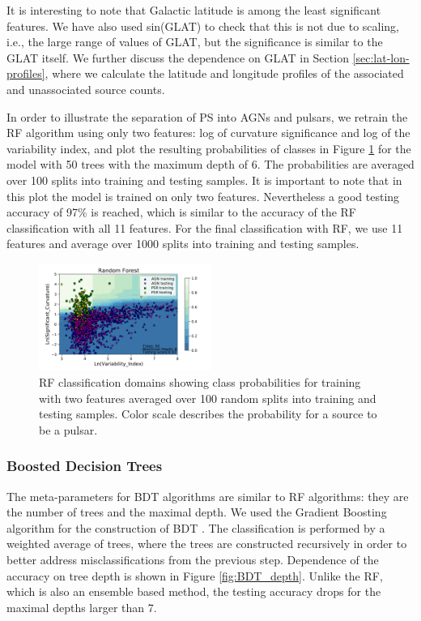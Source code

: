 It is interesting to note that Galactic latitude is among the least significant features.
We have also used sin(GLAT) to check that this is not due to scaling, i.e., the large range of values of GLAT,
but the significance is similar to the GLAT itself.
We further discuss the dependence on GLAT in Section \ref{sec:lat-lon-profiles}, 
where we calculate the latitude and longitude profiles of the associated and unassociated source counts.

In order to illustrate the separation of PS into AGNs and pulsars, we retrain the RF algorithm using only two features: log of curvature significance and log of the variability index, and plot the resulting probabilities of classes in Figure \ref{fig:RF_domains}
for the model with 50 trees with the maximum depth of 6.
The probabilities are averaged over 100 splits into training and testing samples.
It is important to note that in this plot the model is trained on only two features. Nevertheless a good testing accuracy of 97\% is reached, 
which is similar to the accuracy of the RF classification with all 11 features.
For the final classification with RF, we use 11 features and average over 1000 splits into training and testing samples.

\begin{figure}[h]

\includegraphics[width=0.5\textwidth]{plots/classification_domains/rf_50_6_final.pdf}
\caption{RF classification domains showing class probabilities for training with two features
averaged over 100 random splits into training and testing samples.
Color scale describes the probability for a source to be a pulsar.
}
\label{fig:RF_domains}
\end{figure}



\subsubsection{Boosted Decision Trees}

The meta-parameters for BDT algorithms are similar to RF algorithms: they are the number of trees and the maximal depth.
We used the Gradient Boosting algorithm for the construction of BDT \citep{gb}.
The classification is performed by a weighted average of trees, where the trees are constructed recursively in order to better address 
misclassifications from the previous step. 
Dependence of the accuracy on tree depth is shown in Figure \ref{fig:BDT_depth}. 
Unlike the RF, which is also an ensemble based method, the testing accuracy drops for the maximal depths larger than 7. 


